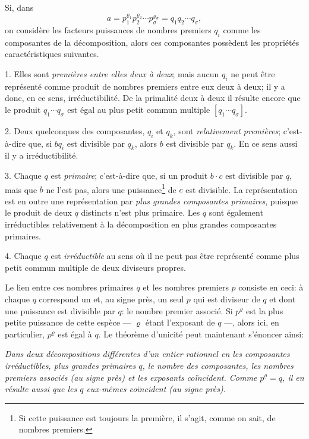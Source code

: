 Si, dans
\[
 a=p_1^{\varrho_1}p_2^{\varrho_2}\cdots p_\sigma^{\varrho_\sigma}=q_1q_2\cdots q_\sigma,
\]
on considère les facteurs puissances de nombres premiers $q_i$ comme les composantes de la décomposition, alors ces composantes possèdent les propriétés caractéristiques suivantes.

1. Elles sont \emph{premières entre elles deux à deux}; mais aucun $q_i$ ne peut être représenté comme produit de nombres premiers entre eux deux à deux; il y a donc, en ce sens, irréductibilité. De la primalité deux à deux il résulte encore que le produit $q_1\cdots q_\sigma$ est égal au plus petit commun multiple $[q_1\cdots q_\sigma]$.

2. Deux quelconques des composantes, $q_i$ et $q_k$, sont \emph{relativement premières}; c'est-à-dire que, si $bq_i$ est divisible par $q_k$, alors $b$ est divisible par $q_k$. En ce sens aussi il y a irréductibilité.

3. Chaque $q$ est \emph{primaire}; c'est-à-dire que, si un produit $b\cdot c$ est divisible par $q$, mais que $b$ ne l'est pas, alors une puissance\footnote{Si cette puissance est toujours la première, il s'agit, comme on sait, de nombres premiers.} de $c$ est divisible. La représentation est en outre une représentation par \emph{plus grandes composantes primaires}, puisque le produit de deux $q$ distincts n'est plus primaire. Les $q$ sont également irréductibles relativement à la décomposition en plus grandes composantes primaires.

4. Chaque $q$ est \emph{irréductible} au sens où il ne peut pas être représenté comme plus petit commun multiple de deux diviseurs propres.

Le lien entre ces nombres primaires $q$ et les nombres premiers $p$ consiste en ceci: à chaque $q$ correspond un et, au signe près, un seul $p$ qui est diviseur de $q$ et dont une puissance est divisible par $q$: le nombre premier associé. Si $p^\varrho$ est la plus petite puissance de cette espèce --- $\varrho$ étant l'exposant de $q$ ---, alors ici, en particulier, $p^\varrho$ est égal à $q$. Le théorème d'unicité peut maintenant s'énoncer ainsi:

\emph{Dans deux décompositions différentes d'un entier rationnel en les composantes irréductibles, plus grandes primaires $q$, le nombre des composantes, les nombres premiers associés (au signe près) et les exposants coïncident. Comme $p^\varrho=q$, il en résulte aussi que les $q$ eux-mêmes coïncident (au signe près).}

